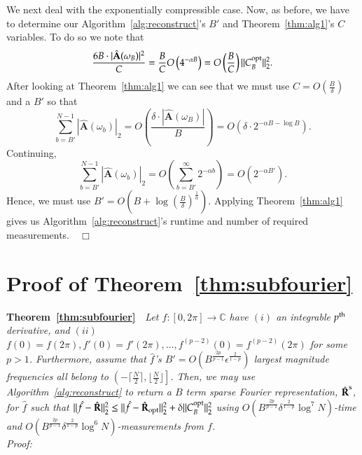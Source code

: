 \documentclass{article}
\begin{document}
We next deal with the exponentially compressible case.  Now, as before, we have to determine our Algorithm~\ref{alg:reconstruct}'s $B'$ and Theorem~\ref{thm:alg1}'s $C$ variables.  To do so we note that
$$\frac{6 B \cdot |\hat{\textbf{A}}(\omega_{B})|^{2}}{C} = \frac{B}{C} O \left( 4^{- \alpha B} \right) = O \left( \frac{B}{C} \right) \| C^{\rm opt}_{B} \|^{2}_{2}.$$
After looking at Theorem~\ref{thm:alg1} we can see that we must use $C = O \left( \frac{B}{\delta} \right)$ and a $B'$ so that
$$\sum^{N-1}_{b=B'} | \hat{\textbf{A}}(\omega_{b}) |_{2} = O \left( \frac{\delta \cdot |\hat{\textbf{A}}(\omega_{B})|}{B} \right) = O \left( \delta \cdot 2^{- \alpha B - \log B} \right).$$
Continuing,
$$\sum^{N-1}_{b = B'} |\hat{\textbf{A}}(\omega_{b})|_{2} = O \left( \sum^{\infty}_{b = B'} 2^{- \alpha b}\right) = O \left( 2^{- \alpha B'} \right).$$
Hence, we must use $B' = O \left( B + \log \left( \frac{B}{\delta} \right)^{\frac{1}{\alpha}} \right)$.  Applying Theorem~\ref{thm:alg1} gives us Algorithm~\ref{alg:reconstruct}'s runtime and number of required measurements.~~$\Box$ \\

\section{Proof of Theorem~\ref{thm:subfourier}}

\noindent \textbf{Theorem~\ref{thm:subfourier}}~~\textit{Let $f: [0,2 \pi] \rightarrow \mathbb{C}$ have $(i)$ an integrable $p^{\rm th}$ derivative, and $(ii)$ $f(0) = f(2 \pi), f'(0) = f'(2 \pi), \dots, f^{(p-2)}(0) = f^{(p-2)}(2 \pi)$ for some $p > 1$.  Furthermore, assume that $\hat{f}$'s $B' = O \left( B^{\frac{2p}{p-1}} \epsilon^{\frac{2}{1-p}} \right)$ largest magnitude frequencies all belong to $\left( - \big\lceil \frac{N}{2} \big\rceil, \big\lfloor \frac{N}{2} \big\rfloor \right]$.  Then, we may use Algorithm~\ref{alg:reconstruct} to return a $B$ term sparse Fourier representation, $\hat{\textbf{R}}^{\rm s}$, for $\hat{f}$ such that $\| \hat{f} - \hat{\textbf{R}} \|^{2}_{2} \leq \| \hat{f} - \hat{\textbf{R}}_{\rm opt} \|^{2}_{2} + \delta \| C^{\rm opt}_{B} \|^{2}_{2}$ using $O \left( B^{\frac{2p}{p-1}} \delta^{\frac{2}{1-p}} \log^{7} N \right)$-time and $O \left( B^{\frac{2p}{p-1}} \delta^{\frac{2}{1-p}} \log^{6} N \right)$-measurements from $f$.}\\

\noindent \textit{Proof:} \\
\end{document}

